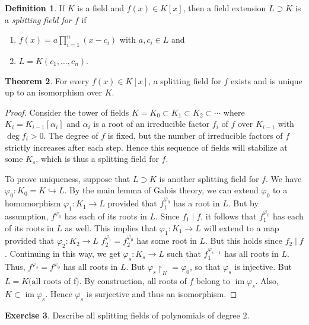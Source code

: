 \documentclass[10pt,letterpaper,cm]{nupset}
\theoremstyle{definition}
\newtheorem{definition}{Definition}[subsection]
\theoremstyle{theorem}
\newtheorem{theorem}[definition]{Theorem}
\newtheorem{exercise}[definition]{Exercise}
\theoremstyle{remark}
\newcommand{\1}{\mathbf{1}}
\newcommand{\0}{\vec 0}
\DeclareMathOperator{\im}{im}
\begin{document}
\begin{definition}
If $K$ is a field and $f(x) \in K[x]$, then a field extension $L \supset K$ is a \textit{splitting field for $f$} if
\begin{enumerate}[label=(\alph*)]
\item $f(x) = a \prod_{i=1}^n (x-c_i)$ with $a, c_i \in L$ and
\item $L = K(c_1, \ldots, c_n)$.
\end{enumerate}
\end{definition}

\begin{theorem}
 For every $f(x) \in K[x]$, a splitting field for $f$ exists and is unique up to an isomorphism over $K$.
\end{theorem}
\begin{proof}
Consider the tower of fields $K= K_0 \subset K_1 \subset K_2 \subset \cdots$ where $K_i = K_{i-1}[\alpha_i]$ and $\alpha_i$ is a root of an irreducible factor $f_i$ of $f$ over $K_{i-1}$ with $\deg{f_i}>0$. The degree of $f$ is fixed, but the number of irreducible factors of $f$ strictly increases after each step. Hence this sequence of fields will stabilize at some $K_s$, which is thus a splitting field for $f$. 

\medskip

 To prove uniqueness, suppose that $L \supset K$ is another splitting field for $f$. We have $\varphi_0 : K_0 = K \hookrightarrow L$. By the main lemma of Galois theory, we can extend $\varphi_0 $ to a homomorphism $\varphi_1 : K_1 \to L$ provided that $f_1^{\varphi_0}$ has a root in $L$. But by assumption, $f^{\varphi_0}$ has each of its roots in $L$. Since $f_1 \mid f$, it follows that $f_1^{\varphi_0}$ has each of its roots in $L$ as well. This implies that $\varphi_1 : K_1 \to L$ will extend to a map provided that $\varphi_2 : K_2 \to L$ $f_2^{\varphi_1} = f_2^{\varphi_0}$ has some root in $L$.  But this holds since $f_2 \mid f$. Continuing in this way, we get $\varphi_s : K_s \to L$ such that $f_1^{\varphi_{s-1}}$ has all roots in $L$. Thus, $f^{\varphi_s} = f^{\varphi_0}$ has all roots in $L$. But $\varphi_s \restriction_K = \varphi_0$, so that $\varphi_s$ is injective. But $L = K(\text{all roots of } $f$)$. By construction, all roots of $f$ belong to $\im{\varphi_s}$. Also, $K \subset \im{\varphi_s}$. Hence $\varphi_s$ is surjective and thus an isomorphism.
\end{proof}

\begin{exercise}
Describe all splitting fields of polynomials of degree $2$.
\end{exercise}
\end{document}

